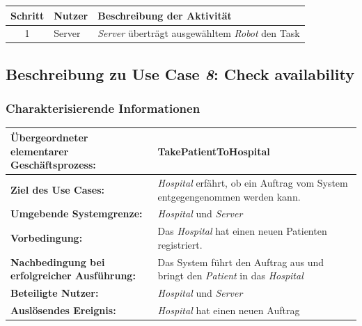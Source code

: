 			\begin{table}[H]
				\centering
				\begin{tabularx}{\textwidth}{|c|p{2cm}|X|}
				\hline
				Schritt & Nutzer & Beschreibung der Aktivität \\ \hline
				1 & Server & \emph{Server} überträgt ausgewähltem \emph{Robot} den Task \\
				\hline
				\end{tabularx}
			\end{table}


	\pagebreak


		\subsection{Beschreibung zu Use Case \emph{8}: Check availability}

			\subsubsection*{Charakterisierende Informationen}

			\begin{table}[H]
				\centering
				\begin{tabularx}{\textwidth}{|p{5cm}|X|}
				\hline
				\textbf{Übergeordneter elementarer Geschäftsprozess:} & TakePatientToHospital  \\ \hline
				\textbf{Ziel des Use Cases:} & \emph{Hospital} erfährt, ob ein Auftrag vom System entgegengenommen werden kann. \\ \hline
				\textbf{Umgebende Systemgrenze:} & \emph{Hospital} und \emph{Server} \\ \hline
				\textbf{Vorbedingung:} & Das \emph{Hospital} hat einen neuen Patienten registriert. \\ \hline
				\textbf{Nachbedingung bei erfolgreicher Ausführung:} & Das System führt den Auftrag aus und bringt den \emph{Patient} in das \emph{Hospital} \\ \hline
				\textbf{Beteiligte Nutzer:} & \emph{Hospital} und \emph{Server}\\ \hline
				\textbf{Auslösendes Ereignis:} & \emph{Hospital} hat einen neuen Auftrag\\
				\hline
				\end{tabularx}
			\end{table}

